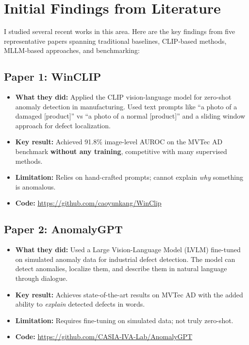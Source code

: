 \documentclass[12pt, a4paper]{article}
\begin{document}
\section{Initial Findings from Literature}

I studied several recent works in this area. Here are the key findings from five representative papers spanning traditional baselines, CLIP-based methods, MLLM-based approaches, and benchmarking:

\subsection{Paper 1: WinCLIP \cite{jeong2023winclip}}
\begin{itemize}[leftmargin=*]
    \item \textbf{What they did:} Applied the CLIP vision-language model for zero-shot anomaly detection in manufacturing. Used text prompts like ``a photo of a damaged [product]'' vs ``a photo of a normal [product]'' and a sliding window approach for defect localization.
    \item \textbf{Key result:} Achieved 91.8\% image-level AUROC on the MVTec AD benchmark \textbf{without any training}, competitive with many supervised methods.
    \item \textbf{Limitation:} Relies on hand-crafted prompts; cannot explain \textit{why} something is anomalous.
    \item \textbf{Code:} \url{https://github.com/caoyunkang/WinClip}
\end{itemize}

\subsection{Paper 2: AnomalyGPT \cite{gu2024anomalygpt}}
\begin{itemize}[leftmargin=*]
    \item \textbf{What they did:} Used a Large Vision-Language Model (LVLM) fine-tuned on simulated anomaly data for industrial defect detection. The model can detect anomalies, localize them, and describe them in natural language through dialogue.
    \item \textbf{Key result:} Achieves state-of-the-art results on MVTec AD with the added ability to \textit{explain} detected defects in words.
    \item \textbf{Limitation:} Requires fine-tuning on simulated data; not truly zero-shot.
    \item \textbf{Code:} \url{https://github.com/CASIA-IVA-Lab/AnomalyGPT}
\end{itemize}
\end{document}
